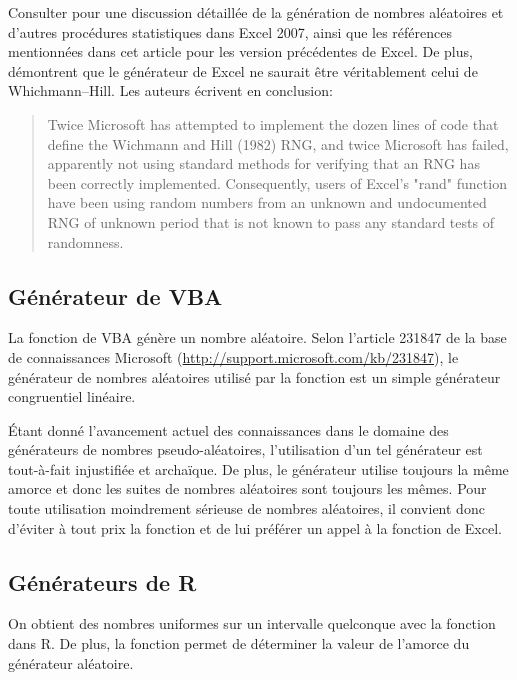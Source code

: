Consulter \cite{McCullough:Excel2007:2008} pour une discussion
détaillée de la génération de nombres aléatoires et d'autres
procédures statistiques dans Excel 2007, ainsi que les références
mentionnées dans cet article pour les version précédentes de Excel. De
plus, \citet{McCullough:MENTWH:2008} démontrent que le générateur de
Excel ne saurait être véritablement celui de Whichmann--Hill. Les
auteurs écrivent en conclusion:

\begin{quote}
  Twice Microsoft has attempted to implement the dozen lines of code
  that define the Wichmann and Hill (1982) RNG, and twice Microsoft
  has failed, apparently not using standard methods for verifying that
  an RNG has been correctly implemented. Consequently, users of
  Excel's "rand" function have been using random numbers from an
  unknown and undocumented RNG of unknown period that is not known to
  pass any standard tests of randomness.
\end{quote}


\subsection{Générateur de VBA}

\begin{sloppypar}
  La fonction  de VBA génère un nombre aléatoire. Selon
  l'article 231847 de la base de connaissances Microsoft
  (\url{http://support.microsoft.com/kb/231847}),
  le générateur de nombres aléatoires utilisé par la fonction
   est un simple générateur congruentiel linéaire.
\end{sloppypar}

Étant donné l'avancement actuel des connaissances dans le domaine des
générateurs de nombres pseudo-aléatoires, l'utilisation d'un tel
générateur est tout-à-fait injustifiée et archaïque. De plus, le
générateur utilise toujours la même amorce et donc les suites de
nombres aléatoires sont toujours les mêmes. Pour toute
utilisation moindrement sérieuse de nombres aléatoires, il convient
donc d'éviter à tout prix la fonction  et de lui
préférer un appel à la fonction  de Excel.


\subsection{Générateurs de R}

On obtient des nombres uniformes sur un intervalle quelconque avec la
fonction  dans R. De plus, la fonction
 permet de déterminer la valeur de l'amorce du
générateur aléatoire.

